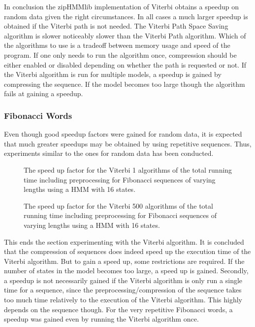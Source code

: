 In conclusion the zipHMMlib implementation of Viterbi obtains a speedup on
random data given the right circumstances. In all cases a much larger speedup
is obtained if the Viterbi path is not needed. The Viterbi Path Space Saving
algorithm is slower noticeably slower than the Viterbi Path algorithm. Which
of the algorithms to use is a tradeoff between memory usage and speed of the
program. If one only needs to run the algorithm once, compression should be
either enabled or disabled depending on whether the path is requested or
not. If the Viterbi algorithm is run for multiple models, a speedup is gained
by compressing the sequence. If the model becomes too large though the
algorithm fails at gaining a speedup.

\subsubsection{Fibonacci Words}

Even though good speedup factors were gained for random data, it is expected
that much greater speedups may be obtained by using repetitive
sequences. Thus, experiments similar to the ones for random data has been
conducted.

\begin{figure}
  \centering
  
  \caption{The speed up factor for the Viterbi 1 algorithms of the total
    running time including preprocessing for Fibonacci sequences of varying
    lengths using a HMM with 16 states.}
  \label{fig:fib_compressed_1_speedup_vs_sequence_length}
\end{figure}

\begin{figure}
  \centering
  
  \caption{The speed up factor for the Viterbi 500 algorithms of the total
    running time including preprocessing for Fibonacci sequences of varying
    lengths using a HMM with 16 states.}
  \label{fig:fib_compressed_500_speedup_vs_sequence_length}
\end{figure}


This ends the section experimenting with the Viterbi algorithm. It is concluded
that the compression of sequences does indeed speed up the execution time of
the Viterbi algorithm. But to gain a speed up, some restrictions are
required. If the number of states in the model becomes too large, a speed up is
gained. Secondly, a speedup is not necessarily gained if the Viterbi algorithm
is only run a single time for a sequence, since the preprocessing/compression of
the sequence takes too much time relatively to the execution of the Viterbi
algorithm. This highly depends on the sequence though. For the very repetitive
Fibonacci words, a speedup was gained even by running the Viterbi algorithm once.

